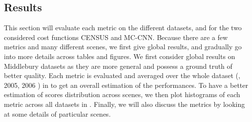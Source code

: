 \subsection{Results}
This section will evaluate each metric on the different datasets, and for the two considered cost functions CENSUS and MC-CNN. Because there are a few metrics and many different scenes, we first give global results, and gradually go into more details across tables and figures. We first consider global results on Middlebury datasets as they are more general and possess a ground truth of better quality. Each metric is evaluated and averaged over the whole dataset (, 2005, 2006 \etc) in  to get an overall estimation of the performances. To have a better estimation of scores distribution across scenes, we then plot histograms of each metric across all datasets in . Finally, we will also discuss the metrics by looking at some details of particular scenes.

